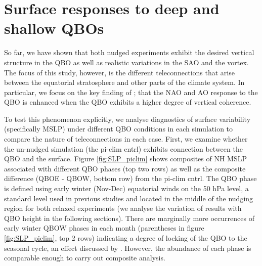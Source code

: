 \section{Surface responses to deep and shallow QBOs}
\label{sec:MSLP_responses}
So far, we have shown that both nudged experiments exhibit the desired vertical structure in the QBO as well as realistic variations in the SAO and the vortex. The focus of this study, however, is the different teleconnections that arise between the equatorial stratosphere and other parts of the climate system. In particular, we focus on the key finding of \cite{andrewsObserved2019d}; that the NAO and AO response to the QBO is enhanced when the QBO exhibits a higher degree of vertical coherence. 

To test this phenomenon explicitly, we analyse diagnostics of surface variability (specifically MSLP) under different QBO conditions in each simulation to compare the nature of teleconnections in each case. First, we examine whether the un-nudged simulation (the pi-clim cntrl) exhibits connection between the QBO and the surface. Figure \ref{fig:SLP_piclim} shows composites of NH MSLP associated with different QBO phases (top two rows) as well as the composite difference (QBOE - QBOW, bottom row) from the pi-clim cntrl. The QBO phase is defined using early winter (Nov-Dec) equatorial winds on the 50 hPa level, a standard level used in previous studies \citep{ansteyHighlatitude2014b} and located in the middle of the nudging region for both relaxed experiments (we analyse the variation of results with QBO height in the following sections). There are marginally more occurrences of early winter QBOW phases in each month (parentheses in figure \ref{fig:SLP_piclim}, top 2 rows) indicating a degree of locking of the QBO to the seasonal cycle, an effect discussed by \cite{rajendranSynchronisation2016b}. However, the abundance of each phase is comparable enough to carry out composite analysis.

